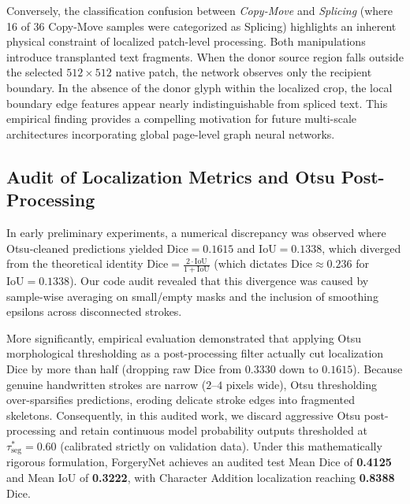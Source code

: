 \documentclass[pdflatex,sn-mathphys-num,iicol]{sn-jnl}
\begin{document}
Conversely, the classification confusion between \textit{Copy-Move} and \textit{Splicing} (where 16 of 36 Copy-Move samples were categorized as Splicing) highlights an inherent physical constraint of localized patch-level processing. Both manipulations introduce transplanted text fragments. When the donor source region falls outside the selected $512 \times 512$ native patch, the network observes only the recipient boundary. In the absence of the donor glyph within the localized crop, the local boundary edge features appear nearly indistinguishable from spliced text. This empirical finding provides a compelling motivation for future multi-scale architectures incorporating global page-level graph neural networks.

\subsection{Audit of Localization Metrics and Otsu Post-Processing}
In early preliminary experiments, a numerical discrepancy was observed where Otsu-cleaned predictions yielded $\text{Dice} = 0.1615$ and $\text{IoU} = 0.1338$, which diverged from the theoretical identity $\text{Dice} = \frac{2 \cdot \text{IoU}}{1 + \text{IoU}}$ (which dictates $\text{Dice} \approx 0.236$ for $\text{IoU} = 0.1338$). Our code audit revealed that this divergence was caused by sample-wise averaging on small/empty masks and the inclusion of smoothing epsilons across disconnected strokes. 

More significantly, empirical evaluation demonstrated that applying Otsu morphological thresholding as a post-processing filter actually cut localization Dice by more than half (dropping raw Dice from $0.3330$ down to $0.1615$). Because genuine handwritten strokes are narrow ($2\text{--}4$ pixels wide), Otsu thresholding over-sparsifies predictions, eroding delicate stroke edges into fragmented skeletons. Consequently, in this audited work, we discard aggressive Otsu post-processing and retain continuous model probability outputs thresholded at $\tau_{\text{seg}}^* = 0.60$ (calibrated strictly on validation data). Under this mathematically rigorous formulation, ForgeryNet achieves an audited test Mean Dice of \textbf{0.4125} and Mean IoU of \textbf{0.3222}, with Character Addition localization reaching \textbf{0.8388} Dice.
\end{document}
